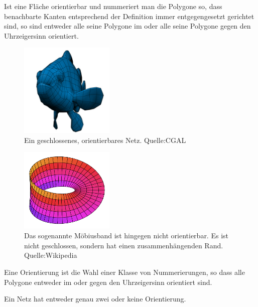 \begin{Bemerkung}
Ist eine Fläche orientierbar und nummeriert man die Polygone so, dass benachbarte Kanten entsprechend der Definition immer entgegengesetzt gerichtet sind, so sind entweder alle seine Polygone im oder alle seine Polygone gegen den Uhrzeigersinn orientiert.
\end{Bemerkung}

\begin{figure}[H]
    \centering
    \includegraphics[width=0.4\textwidth]{images/clown_fish.jpg}
    \caption{Ein geschlossenes, orientierbares Netz. Quelle:CGAL}
    \label{fig:closed-orientable-mesh}
\end{figure}

\begin{figure}[H]
    \centering
    \includegraphics[width=0.4\textwidth]{images/Moebius_strip.png}
    \caption[Möbiusband. Quelle:Wikipedia]
             {Das sogenannte Möbiusband ist hingegen nicht orientierbar. 
             Es ist nicht geschlossen, sondern hat einen zusammenhängenden Rand. 
             Quelle:Wikipedia}
    \label{fig:moebius-strip}
\end{figure}

\begin{Definition}
Eine Orientierung ist die Wahl einer Klasse von Nummerierungen, so dass alle Polygone entweder im oder gegen den Uhrzeigersinn orientiert sind.
\end{Definition}

\begin{Bemerkung}
Ein Netz hat entweder genau zwei oder keine Orientierung.  
\end{Bemerkung}


